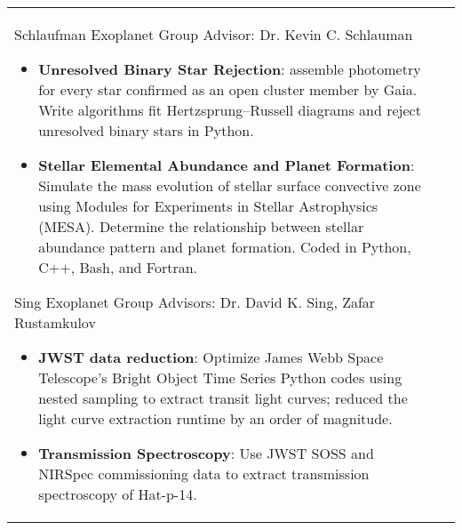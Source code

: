 \documentclass[10pt]{article} %
\begin{document}




\begin{supertabular}{L{4cm}@{\hskip 0.3in}L{13cm}} %

{Schlaufman Exoplanet Group} %
{Advisor: Dr. Kevin C. Schlauman} %
{\begin{itemize}
\vspace{-0.4cm}
    \item \textbf{Unresolved Binary Star Rejection}:  assemble photometry for every star confirmed as an open cluster member by Gaia. Write algorithms fit Hertzsprung–Russell diagrams and reject unresolved binary stars in Python.
    \item \textbf{Stellar Elemental Abundance and Planet Formation}: Simulate the mass evolution of stellar surface convective zone using Modules for Experiments in Stellar Astrophysics (MESA). Determine the relationship between stellar abundance pattern and planet formation. Coded in Python, C++, Bash, and Fortran. 
\end{itemize}} %

{Sing Exoplanet Group} %
{Advisors: Dr. David K. Sing, Zafar Rustamkulov} %
{\begin{itemize}
\vspace{-0.4cm}
    \item \textbf{JWST data reduction}: Optimize James Webb Space Telescope's Bright Object Time Series Python codes using nested sampling to extract transit light curves; reduced the light curve extraction runtime by an order of magnitude.
    \item \textbf{Transmission Spectroscopy}: Use JWST SOSS and NIRSpec commissioning data to extract transmission spectroscopy of Hat-p-14. 
\end{itemize}} %


\end{supertabular}
\end{document}
